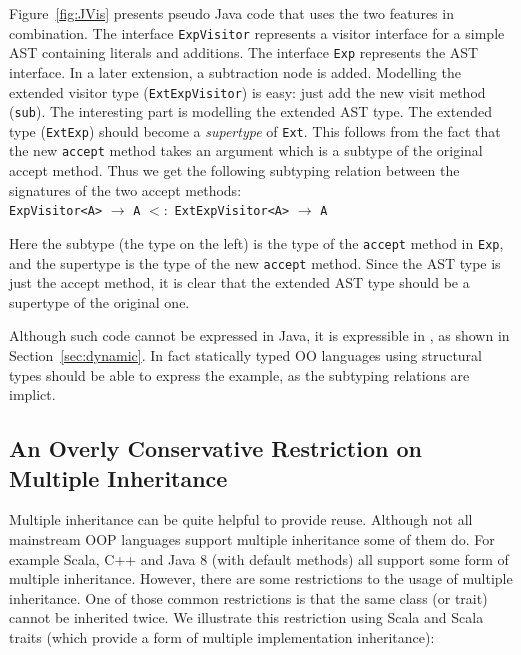Figure~\ref{fig:JVis} presents pseudo Java code that uses the two
features in combination. The interface \lstinline{ExpVisitor} represents a
visitor interface for a simple AST containing literals and
additions.  The interface \lstinline{Exp} represents the AST interface.
In a later extension, a subtraction node is added. Modelling the
extended visitor type (\lstinline{ExtExpVisitor}) is easy: just add the new visit
method (\lstinline{sub}). The interesting part is modelling the extended AST
type. The extended type (\lstinline{ExtExp}) should become a \emph{supertype} of  
\lstinline{Ext}. This follows from the fact that the new \lstinline{accept} method takes 
an argument which is a subtype of the original accept method. Thus we 
get the following subtyping relation between the signatures of the two
accept methods: \\

\lstinline{ExpVisitor<A>} $\to$ \lstinline{A} $<:$ \lstinline{ExtExpVisitor<A>} $\to$ \lstinline{A}

\noindent Here the subtype (the type on the left) is the type of the
\lstinline{accept} method in \lstinline{Exp}, and the supertype is the type of
the new \lstinline{accept} method. Since the AST type is just the
accept method, it is clear that the extended AST type should be a
supertype of the original one. 

Although such code cannot be expressed in Java, it is expressible in
\name, as shown in Section~\ref{sec:dynamic}. In fact statically typed 
OO languages using structural types should be able to express 
the example, as the subtyping relations are implict. 

\subsection{An Overly Conservative Restriction on Multiple Inheritance}

Multiple inheritance can be quite helpful to provide reuse. 
Although not all mainstream OOP languages support multiple
inheritance some of them do. For example Scala, C++ and Java 8
(with default methods) all support some form of multiple inheritance. 
However, there are some restrictions to the usage of multiple
inheritance. One of those common restrictions is that the same class (or trait)
cannot be inherited twice. We illustrate this restriction using Scala
and Scala traits (which provide a form of multiple implementation inheritance):

